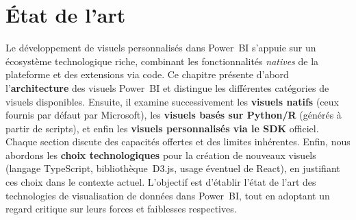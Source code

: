 \chapter{État de l'art}
\label{chap:state-of-the-art}
\setlength{\parindent}{0pt}


Le développement de visuels personnalisés dans Power~BI s’appuie sur un
écosystème technologique riche, combinant les fonctionnalités \emph{natives}
de la plateforme et des extensions via code.  
Ce chapitre présente d’abord l’\textbf{architecture} des visuels Power~BI et
distingue les différentes catégories de visuels disponibles.  
Ensuite, il examine successivement les \textbf{visuels natifs}
(ceux fournis par défaut par Microsoft), les \textbf{visuels basés sur
Python/R} (générés à partir de scripts), et enfin les \textbf{visuels
personnalisés via le SDK} officiel.  
Chaque section discute des capacités offertes et des limites inhérentes.  
Enfin, nous abordons les \textbf{choix technologiques} pour la création de
nouveaux visuels (langage TypeScript, bibliothèque~D3.js, usage éventuel de
React), en justifiant ces choix dans le contexte actuel.  
L’objectif est d’établir l’état de l’art des technologies de visualisation de
données dans Power~BI, tout en adoptant un regard critique sur leurs forces et
faiblesses respectives.

















